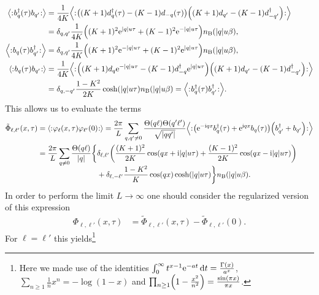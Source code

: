 \documentclass[english, parskip=full]{scrartcl}
\begin{document}
\begin{align}
\bra*{\normord{b_q^\dagger(\tau) b_{q'}}} &= \frac{1}{4K}\bra*{\normord{\kla*{(K+1) d_q^\dagger(\tau) - (K-1) d_{-q}(\tau)} \kla*{(K+1) d_{q'} - (K-1) d_{-q'}^\dagger}}}\\
&= \delta_{q,q'} \frac{1}{4K} \kla*{(K+1)^2 \powe{|q|u\tau} + (K-1)^2\powe{-|q|u\tau}} n_\B(|q|u\beta),\\
\bra*{\normord{b_q(\tau) b_{q'}^\dagger}} &= \delta_{q,q'} \frac{1}{4K} \kla*{(K+1)^2 \powe{-|q|u\tau} + (K-1)^2\powe{|q|u\tau}} n_\B(|q|u\beta),\\
\bra*{\normord{b_q(\tau) b_{q'}}} &= \frac{1}{4K}\bra*{\normord{\kla*{(K+1) d_q \powe{-|q|u\tau} - (K-1) d_{-q}^\dagger \powe{|q|u\tau}} \kla*{(K+1) d_{q'} - (K-1) d_{-q'}^\dagger}}}\\
&= \delta_{q,-q'} \frac{1-K^2}{2K} \cosh\kla*{|q|u\tau}  n_\B(|q|u\beta) = \bra*{\normord{b_q^\dagger(\tau) b_{q'}^\dagger}}.
\end{align}
This allows us to evaluate the terms
\begin{align}
\tilde{\Phi}_{\ell,\ell'}(x,\tau) &= \bra*{\normord{\varphi_\ell(x,\tau) \varphi_{\ell'}(0)}} = \frac{2\pi}{L} \sum_{q,q'\neq 0} \frac{\Theta(q\ell) \Theta(q'\ell')}{\sqrt{|qq'|}} \bra*{\normord{\kla*{\powe{-\i qx} b_q^\dagger(\tau) + \powe{\i qx} b_q(\tau)} \kla*{b_{q'}^\dagger + b_{q'}}}}\\
&= \frac{2\pi}{L} \sum_{q\neq 0} \frac{\Theta(q\ell)}{|q|} \bsplit{\klc[\bigg]{&\delta_{\ell,\ell'} \kla*{\frac{(K+1)^2}{2K} \cos\kla*{qx + \i |q|u\tau} + \frac{(K-1)^2}{2K} \cos\kla*{qx - \i |q|u\tau} } \\
&+ \delta_{\ell,-\ell'} \frac{1 - K^2}{K} \cos(qx) \cosh(|q|u\tau) } n_\B(|q|u\beta). }
\end{align}
In order to perform the limit $L\rightarrow \infty$ one should consider the regularized version of this expression
\begin{align}
\Phi_{\ell,\ell'}(x,\tau) &= \tilde{\Phi}_{\ell,\ell'}(x,\tau) - \tilde{\Phi}_{\ell,\ell'}(0).
\end{align}
For $\ell=\ell'$ this yields\footnote{Here we made use of the identities $\int_{0}^{\infty} t^{x-1} \text{e}^{-at} \,\mathrm{d}t = \frac{\Gamma(x)}{a^x}$, $\sum_{n\ge 1} \frac{1}{n} x^n = -\log(1-x)$ and $\prod_{n\ge 1} \kla*{1 - \frac{x^2}{n^2}} = \frac{\sin(\pi x)}{\pi x}$.}
\end{document}
